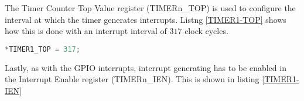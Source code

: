 The Timer Counter Top Value register (TIMERn\_TOP) is used to configure the interval at which the timer generates interrupts. Listng \ref{TIMER1-TOP} shows how this is done with an interrupt interval of $317$ clock cycles.

\begin{lstlisting}[language=C, label=TIMER1-TOP, caption=Setting interrupt interval]
*TIMER1_TOP = 317;
\end{lstlisting}

Lastly, as with the GPIO interrupts, interrupt generating has to be enabled in the Interrupt Enable register (TIMERn\_IEN). This is shown in listing \ref{TIMER1-IEN}

